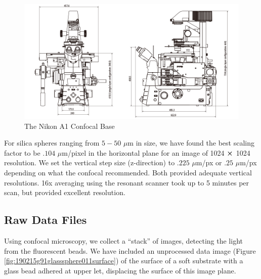 \begin{figure}
	\centering
	\includegraphics[width=0.8\linewidth]{confocal_stuff/Ti2_diagram_1}
	\caption[Nikon Ti2 Microscope Base]{The Nikon A1 Confocal Base}
	\label{fig:ti2diagram1}
\end{figure}

For silica spheres ranging from $5-50$ $\mu$m in size, we have found the best scaling factor to be $.104$ $\mu$m/pixel in the horizontal plane for an image of 1024 $ \cross $ 1024 resolution. We set the vertical step size (z-direction) to $.225$ $\mu$m/px or $.25$ $\mu$m/px depending on what the confocal recommended. Both provided adequate vertical resolutions. 16x averaging using the resonant scanner took up to 5 minutes per scan, but provided excellent resolution. 

\subsection{Raw Data Files}
Using confocal microscopy, we collect a ``stack'' of images, detecting the light from the fluorescent beads. We have included an unprocessed data image (Figure \ref{fig:190215g91glasssphere011surface}) of the surface of a soft substrate with a glass bead adhered at upper let, displacing the surface of this image plane.

